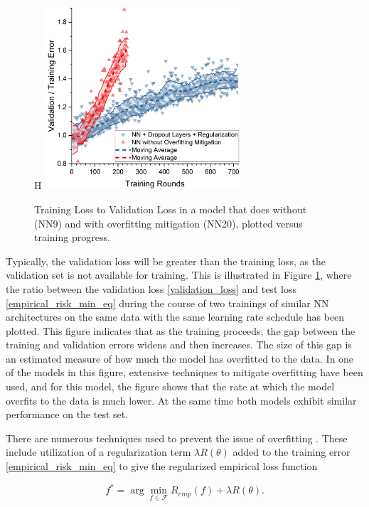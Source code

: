 \begin{figure}{H}
    \centering
    \includegraphics[width=0.65\textwidth]{sipfenn/validationtotraining_generalized.png}
    \caption{Training Loss to Validation Loss in a model that does without (NN9) and with overfitting mitigation (NN20), plotted versus training progress.}
    \label{sipfenn:fig:trainingvalidation}
\end{figure}

Typically, the validation loss will be greater than the training loss, as the validation set is not available for training. This is illustrated in Figure \ref{sipfenn:fig:trainingvalidation}, where the ratio between the validation loss \eqref{validation_loss} and test loss \eqref{empirical_risk_min_eq} during the course of two trainings of similar NN architectures on the same data with the same learning rate schedule has been plotted. This figure indicates that as the training proceeds, the gap between the training and validation errors widens and then increases. The size of this gap is an estimated measure of how much the model has overfitted to the data. In one of the models in this figure, extensive techniques to mitigate overfitting have been used, and for this model, the figure shows that the rate at which the model overfits to the data is much lower. At the same time both models exhibit similar performance on the test set.

There are numerous techniques used to prevent the issue of overfitting \cite{hastie2009elements,everitt2002cambridge}. These include utilization of a regularization term $\lambda R(\theta)$ added to the training error \eqref{empirical_risk_min_eq} to give the regularized empirical loss function

\begin{equation}
    f^* = \arg\min_{f\in \mathcal{F}} R_{emp}(f) + \lambda R(\theta).
\end{equation}

